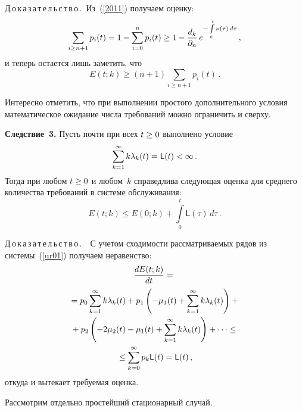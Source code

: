 \begin{multicols}{2}
\noindent
Д\,о\,к\,а\,з\,а\,т\,е\,л\,ь\,с\,т\,в\,о\,.\
Из~(\ref{2011}) получаем оценку:
\begin{equation*}
\sum_{i \ge n+1} p_i (t) = 1 - \sum\limits_{i=0}^{n } p_i (t) \ge 1 -
\displaystyle\frac{\displaystyle d_k\mathstrut}{\displaystyle {\partial}_n\mathstrut}\, e^{-\int\limits_0^t \nu(\tau) \, d\tau}\,, 
\end{equation*}
и теперь остается лишь заметить, что  
$$
E(t;k) \ge \left(n+1\right) \sum\limits_{i \ge n+1} p_i (t)\,.
$$

\smallskip

Интересно отметить, что при выполнении прос\-то\-го дополнительного условия математическое 
ожидание числа требований можно ограничить и сверху.

\medskip

\noindent
\textbf{Следствие~3.}
Пусть почти при всех $t \hm\ge 0$ выполнено условие
\begin{equation*}
\sum\limits_{k=1}^{\infty}k\lambda_k(t) = {\sf L}(t) < \infty\,.
\end{equation*}
Тогда при любом $t \hm\ge 0$ и любом~$k$ справедлива следующая оценка для среднего количества требований в системе обслуживания:
\begin{equation*}
E(t;k) \le E(0;k) + \int\limits_0^t \textsf{L}(\tau) \, d\tau\,.  
\end{equation*}

\noindent
Д\,о\,к\,а\,з\,а\,т\,е\,л\,ь\,с\,т\,в\,о\,.\ \ 
С учетом сходимости рас\-смат\-ри\-ва\-емых рядов из системы~(\ref{ur01}) получаем неравенство:
\begin{multline*}
\displaystyle\frac{\displaystyle dE(t;k)\mathstrut}{\displaystyle dt\mathstrut} ={}\\
{}= p_0\sum\limits_{k=1}^{\infty}k\lambda_k(t) + 
p_1 \left(-\mu_1(t)+\sum\limits_{k=1}^{\infty}k\lambda_k(t)\right) +{} \\
{}+p_2 \left(-2\mu_2(t)-\mu_1(t)+\sum\limits_{k=1}^{\infty}k\lambda_k(t)\right) + 
\cdots\le{}\\
{}\le \sum\limits_{k=0}^{\infty}p_k {\sf L}(t) = {\sf L}(t)\,, 
\end{multline*}
откуда и вытекает требуемая оценка.

\smallskip

Рассмотрим отдельно простейший стационарный случай.

\smallskip



\end{multicols}
